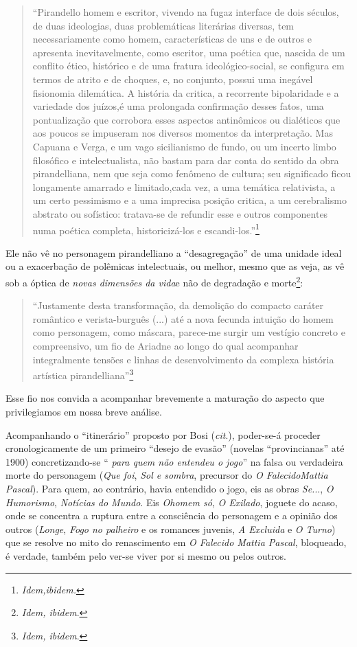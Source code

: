 \begin{quote}
``Pirandello homem e escritor, vivendo na fugaz interface de dois
séculos, de duas ideologias, duas problemáticas literárias diversas, tem
necessariamente como homem, características de uns e de outros e
apresenta inevitavelmente, como escritor, uma poética que, nascida de um
conflito ético, histórico e de uma fratura ideológico-social, se
configura em termos de atrito e de choques, e, no conjunto, possui uma
inegável fisionomia dilemática. A história da critica, a recorrente
bipolaridade e a variedade dos juízos,é uma prolongada confirmação
desses fatos, uma pontualização que corrobora esses aspectos antinômicos
ou dialéticos que aos poucos se impuseram nos diversos momentos da
interpretação. Mas Capuana e Verga, e um vago sicilianismo de fundo, ou
um incerto limbo filosófico e intelectualista, não bastam para dar conta
do sentido da obra pirandelliana, nem que seja como fenômeno de cultura;
seu significado ficou longamente amarrado e limitado,cada vez, a uma
temática relativista, a um certo pessimismo e a uma imprecisa posição
critica, a um cerebralismo abstrato ou sofístico: tratava-se de refundir
esse e outros componentes numa poética completa, historicizá-los e
escandi-los.''\footnote{\emph{Idem,ibidem.}}
\end{quote}

Ele não vê no personagem pirandelliano a ``desagregação'' de uma unidade
ideal ou a exacerbação de polêmicas intelectuais, ou melhor, mesmo que
as veja, as vê sob a óptica de \emph{novas dimensões da vida}e não de
degradação e morte\footnote{\emph{Idem, ibidem}.}:

\begin{quote}
``Justamente desta transformação, da demolição do compacto caráter
romântico e verista-burguês (...) até a nova fecunda intuição do homem
como personagem, como máscara, parece-me surgir um vestígio concreto e
compreensivo, um fio de Ariadne ao longo do qual acompanhar
integralmente tensões e linhas de desenvolvimento da complexa história
artística pirandelliana''\footnote{\emph{Idem, ibidem}.}
\end{quote}

Esse fio nos convida a acompanhar brevemente a maturação do aspecto que
privilegiamos em nossa breve análise.

Acompanhando o ``itinerário'' proposto por Bosi (\emph{cit}.),
poder-se-á proceder cronologicamente de um primeiro ``desejo de evasão''
(novelas ``provincianas'' até 1900) concretizando-se `` \emph{para quem
não entendeu o jogo}'' na falsa ou verdadeira morte do personagem
(\emph{Que foi}, \emph{Sol e sombra}, precursor do \emph{O
FalecidoMattia Pascal}). Para quem, ao contrário, havia entendido o
jogo, eis as obras \emph{Se.}.., \emph{O Humorismo}, \emph{Notícias do
Mundo}. Eis \emph{Ohomem só}, \emph{O Exilado}, joguete do acaso, onde
se concentra a ruptura entre a consciência do personagem e a opinião dos
outros (\emph{Longe}, \emph{Fogo no palheiro} e os romances juvenis,
\emph{A Excluida} e \emph{O Turno}) que se resolve no mito do
renascimento em \emph{O Falecido Mattia Pascal}, bloqueado, é verdade,
também pelo ver-se viver por si mesmo ou pelos outros.

